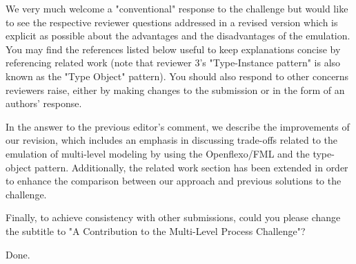 \documentclass[10pt]{article}
\begin{document}
\begin{response}{We very much welcome a "conventional" response to the challenge but would like to see the respective reviewer questions addressed in a revised version which is explicit as possible about the advantages and the disadvantages of the emulation. You may find the references listed below useful to keep explanations concise by referencing related work (note that reviewer 3's "Type-Instance pattern" is also known as the "Type Object" pattern). You should also respond to other concerns reviewers raise, either by making changes to the submission or in the form of an authors' response.}

In the answer to the previous editor's comment, we describe the improvements of our revision, which includes an emphasis in discussing trade-offs related to the emulation of multi-level modeling by using the Openflexo/FML and the type-object pattern. Additionally, the related work section has been extended in order to enhance the comparison between our approach and previous solutions to the challenge.%

\end{response}


\begin{response}{Finally, to achieve consistency with other submissions, could you please change the subtitle to "A Contribution to the Multi-Level Process Challenge"?}

Done.
\end{response}

\pagebreak
\end{document}
